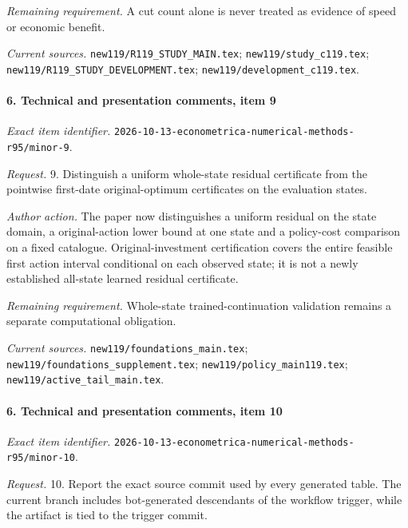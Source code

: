 \par\emph{Remaining requirement.} A cut count alone is never treated as evidence of speed or economic benefit.

\par\emph{Current sources.} \nolinkurl{new119/R119_STUDY_MAIN.tex}; \nolinkurl{new119/study_c119.tex}; \nolinkurl{new119/R119_STUDY_DEVELOPMENT.tex}; \nolinkurl{new119/development_c119.tex}.

\paragraph{6. Technical and presentation comments, item 9}

\emph{Exact item identifier.} \nolinkurl{2026-10-13-econometrica-numerical-methods-r95/minor-9}.

\par\emph{Request.} 9. Distinguish a uniform whole-state residual certificate from the pointwise first-date original-optimum certificates on the evaluation states.

\par\emph{Author action.} The paper now distinguishes a uniform residual on the state domain, a original-action lower bound at one state and a policy-cost comparison on a fixed catalogue. Original-investment certification covers the entire feasible first action interval conditional on each observed state; it is not a newly established all-state learned residual certificate.

\par\emph{Remaining requirement.} Whole-state trained-continuation validation remains a separate computational obligation.

\par\emph{Current sources.} \nolinkurl{new119/foundations_main.tex}; \nolinkurl{new119/foundations_supplement.tex}; \nolinkurl{new119/policy_main119.tex}; \nolinkurl{new119/active_tail_main.tex}.

\paragraph{6. Technical and presentation comments, item 10}

\emph{Exact item identifier.} \nolinkurl{2026-10-13-econometrica-numerical-methods-r95/minor-10}.

\par\emph{Request.} 10. Report the exact source commit used by every generated table. The current branch includes bot-generated descendants of the workflow trigger, while the artifact is tied to the trigger commit.

